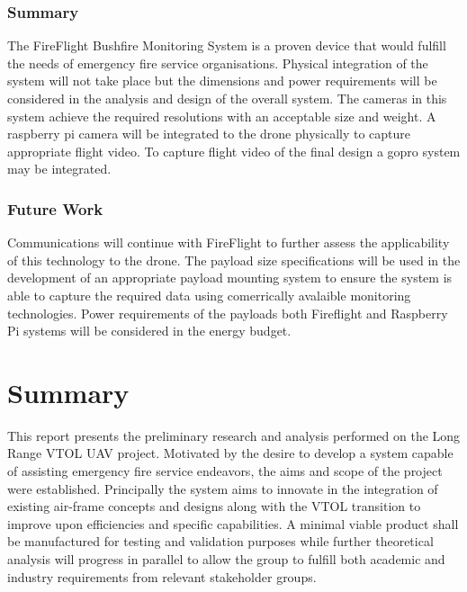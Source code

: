 \subsubsection{Summary}
The FireFlight Bushfire Monitoring System is a proven device that would fulfill the needs of emergency fire service organisations. Physical integration of the system will not take place but the dimensions and power requirements will be considered in the analysis and design of the overall system. The cameras in this system achieve the required resolutions with an acceptable size and weight. A raspberry pi camera will be integrated to the drone physically to capture  appropriate flight video. To capture flight video of the final design a gopro system may be integrated.

\subsubsection{Future Work}
Communications will continue with FireFlight to further assess the applicability of this technology to the drone. The payload size specifications will be used in the development of an appropriate payload mounting system to ensure the system is able to capture the required data using comerrically avalaible monitoring technologies. Power requirements of the payloads both Fireflight and Raspberry Pi systems will be considered in the energy budget. 

\clearpage











\clearpage
\section{Summary}
This report presents the preliminary research and analysis performed on the Long Range VTOL UAV project. Motivated by the desire to develop a system capable of assisting emergency fire service endeavors, the aims and scope of the project were established. Principally the system aims to innovate in the integration of existing air-frame concepts and designs along with the VTOL transition to improve upon efficiencies and specific capabilities. A minimal viable product shall be manufactured for testing and validation purposes while further theoretical analysis will progress in parallel to allow the group to fulfill both academic and industry requirements from relevant stakeholder groups. 

